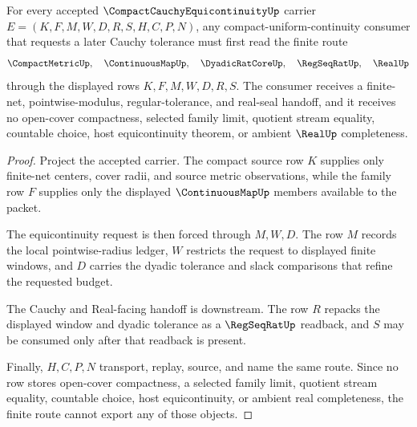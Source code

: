 \begin{theorem}
\label{thm:compact-cauchy-equicontinuity-finite-route}
For every accepted $\CompactCauchyEquicontinuityUp$ carrier $E=(K,F,M,W,D,R,S,H,C,P,N)$, any compact-uniform-continuity consumer that requests a later Cauchy tolerance must first read the finite route
$$
\CompactMetricUp,\quad \ContinuousMapUp,\quad \DyadicRatCoreUp,\quad \RegSeqRatUp,\quad \RealUp
$$
through the displayed rows $K,F,M,W,D,R,S$. The consumer receives a finite-net, pointwise-modulus, regular-tolerance, and real-seal handoff, and it receives no open-cover compactness, selected family limit, quotient stream equality, countable choice, host equicontinuity theorem, or ambient $\RealUp$ completeness.
\end{theorem}
\begin{proof}
Project the accepted carrier. The compact source row $K$ supplies only finite-net centers, cover radii, and source metric observations, while the family row $F$ supplies only the displayed $\ContinuousMapUp$ members available to the packet.

The equicontinuity request is then forced through $M,W,D$. The row $M$ records the local pointwise-radius ledger, $W$ restricts the request to displayed finite windows, and $D$ carries the dyadic tolerance and slack comparisons that refine the requested budget.

The Cauchy and Real-facing handoff is downstream. The row $R$ repacks the displayed window and dyadic tolerance as a $\RegSeqRatUp$ readback, and $S$ may be consumed only after that readback is present.

Finally, $H,C,P,N$ transport, replay, source, and name the same route. Since no row stores open-cover compactness, a selected family limit, quotient stream equality, countable choice, host equicontinuity, or ambient real completeness, the finite route cannot export any of those objects.
\end{proof}


